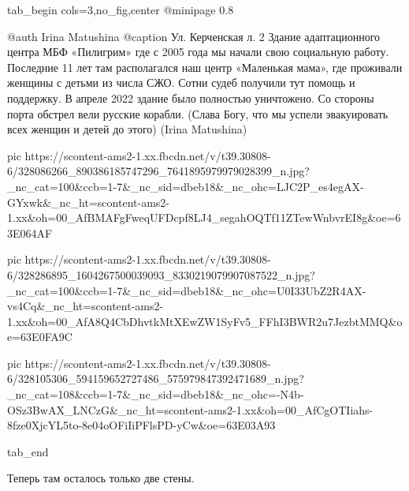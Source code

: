  
 
 
 
 

\begin{minipage}{\textwidth}

\ifcmt
  tab_begin cols=3,no_fig,center
     @minipage 0.8

     @auth Irina Matushina
     @caption Ул. Керченская л. 2 Здание адаптационного центра МБФ «Пилигрим» где с 2005 года мы начали свою социальную работу. Последние 11 лет там располагался наш центр «Маленькая мама», где проживали женщины с детьми из числа СЖО. Сотни судеб получили тут помощь и поддержку. В апреле 2022 здание было полностью уничтожено. Со стороны порта обстрел вели русские корабли. (Слава Богу, что мы успели эвакуировать всех женщин и детей до этого) (Irina Matushina)

     pic https://scontent-ams2-1.xx.fbcdn.net/v/t39.30808-6/328086266_890386185747296_7641895979979028399_n.jpg?_nc_cat=100&ccb=1-7&_nc_sid=dbeb18&_nc_ohc=LJC2P_es4egAX-GYxwk&_nc_ht=scontent-ams2-1.xx&oh=00_AfBMAFgFweqUFDcpf8LJ4_segahOQTf11ZTewWnbvrEI8g&oe=63E064AF

     pic https://scontent-ams2-1.xx.fbcdn.net/v/t39.30808-6/328286895_1604267500039093_8330219079907087522_n.jpg?_nc_cat=100&ccb=1-7&_nc_sid=dbeb18&_nc_ohc=U0I33UbZ2R4AX-vs4Cq&_nc_ht=scontent-ams2-1.xx&oh=00_AfA8Q4CbDhvtkMtXEwZW1SyFv5_FFhI3BWR2u7JezbtMMQ&oe=63E0FA9C

     pic https://scontent-ams2-1.xx.fbcdn.net/v/t39.30808-6/328105306_594159652727486_575979847392471689_n.jpg?_nc_cat=108&ccb=1-7&_nc_sid=dbeb18&_nc_ohc=-N4b-OSz3BwAX_LNCzG&_nc_ht=scontent-ams2-1.xx&oh=00_AfCgOTIiahs-8fze0XjcYL5to-8e04oOFiIiPFlsPD-yCw&oe=63E03A93

  tab_end
\fi
\end{minipage}


Теперь там осталось только две стены.
